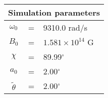  \begin{tabular}{ccl}
\multicolumn{3}{c}{Simulation parameters} \\
\hline
$\omega_0$  &=& 9310.0 rad/s\\
$B_0$  &=& $ 1.581\times 10^{14} $ G \\
$\chi$  &=& 89.99$^{\circ}$ \\
$a_0$ &=& 2.00$^{\circ}$ \\
$\tilde{\theta}$ &= & 2.00$^{\circ}$
\end{tabular}
    